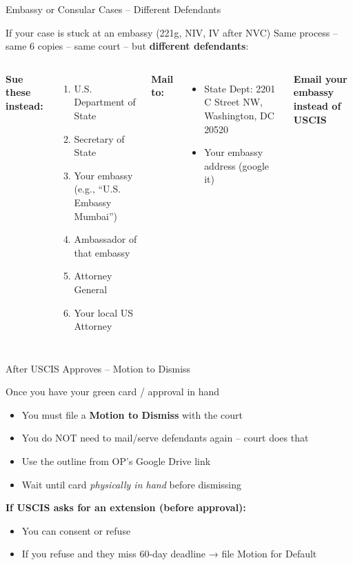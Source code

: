 \documentclass[10pt,aspectratio=169]{beamer}
\begin{document}
	\begin{frame}{Embassy or Consular Cases – Different Defendants}
		\begin{alertblock}{If your case is stuck at an embassy (221g, NIV, IV after NVC)}
			Same process – same 6 copies – same court – but \textbf{different defendants}:
		\end{alertblock}
		\begin{columns}[T]
			\textbf{Sue these instead:}
			\begin{enumerate}
				\item U.S. Department of State
				\item Secretary of State
				\item Your embassy (e.g., “U.S. Embassy Mumbai”)
				\item Ambassador of that embassy
				\item Attorney General
				\item Your local US Attorney
			\end{enumerate}
			\textbf{Mail to:}
			\begin{itemize}
				\item State Dept: 2201 C Street NW, Washington, DC 20520
				\item Your embassy address (google it)
			\end{itemize}
			\textbf{Email your embassy instead of USCIS}
		\end{columns}
	\end{frame}
	
	\begin{frame}{After USCIS Approves – Motion to Dismiss}
		\begin{block}{Once you have your green card / approval in hand}
			\begin{itemize}
				\item You must file a \textbf{Motion to Dismiss} with the court
				\item You do NOT need to mail/serve defendants again – court does that
				\item Use the outline from OP’s Google Drive link
				\item Wait until card \textit{physically in hand} before dismissing
			\end{itemize}
		\end{block}
		\textbf{If USCIS asks for an extension (before approval):}
		\begin{itemize}
			\item You can consent or refuse
			\item If you refuse and they miss 60-day deadline → file Motion for Default
		\end{itemize}
	\end{frame}
	
\end{document}
